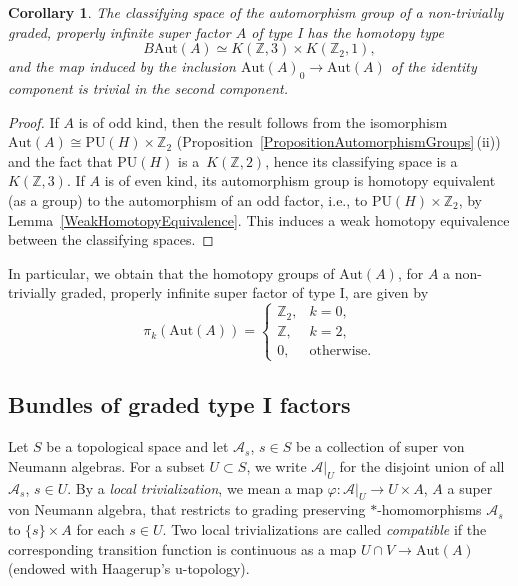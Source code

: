 \documentclass[pdftex]{sigma}
\numberwithin{equation}{section}
\newtheorem{Corollary}[Theorem]{Corollary}
\newcommand{\Z}{\mathbb{Z}}
\newcommand{\A}{\mathcal{A}}
\newcommand{\Aut}{\mathrm{Aut}}
\begin{document}
\begin{Corollary} \label{CorollaryHomotopyType}
The classifying space of the automorphism group of a non-trivially graded, properly infinite super factor $A$ of type I has the homotopy type
\begin{equation*}
B\Aut(A) \simeq K(\Z, 3) \times K(\Z_2, 1),
\end{equation*}
and the map induced by the inclusion $\Aut(A)_0 \to \Aut(A)$ of the identity component is trivial in the second component.
\end{Corollary}

\begin{proof}
If $A$ is of odd kind, then the result follows from the isomorphism ${\Aut(A) \cong \mathrm{PU}(H)\times \Z_2}$ (Proposition~\ref{PropositionAutomorphismGroups}\,(ii)) and the fact that $\mathrm{PU}(H)$ is a~$K(\Z, 2)$, hence its classifying space is a~$K(\Z, 3)$.
If $A$ is of even kind, its automorphism group is homotopy equivalent (as a group) to the automorphism of an odd factor, i.e., to $\mathrm{PU}(H) \times \Z_2$, by Lemma~\ref{WeakHomotopyEquivalence}.
This induces a weak homotopy equivalence between the classifying spaces.
\end{proof}

In particular, we obtain that the homotopy groups of $\Aut(A)$, for $A$ a non-trivially graded, properly infinite super factor of type I, are given by
\begin{equation} \label{HomotopyGroupsAutA}
 \pi_k(\Aut(A)) = \begin{cases} \Z_2, & k=0, \\ \Z, & k=2, \\ 0, & \text{otherwise}. \end{cases}
\end{equation}

\subsection{Bundles of graded type I factors} \label{SectionBundles}

Let $S$ be a topological space and let $\A_s$, $s \in S$ be a collection of super von Neumann algebras.
For a subset $U \subset S$, we write $\A|_U$ for the disjoint union of all $\A_s$, $s \in U$.
By a \emph{local trivialization}, we mean a map $\varphi\colon \A|_U \to U \times A$, $A$ a super von Neumann algebra, that restricts to grading preserving $*$-homomorphisms $\A_s$ to $\{s\} \times A$ for each $s \in U$.
Two local trivializations are called \emph{compatible} if the corresponding transition function is continuous as a map $U \cap V \to \Aut(A)$ (endowed with Haagerup's u-topology).
\end{document}
